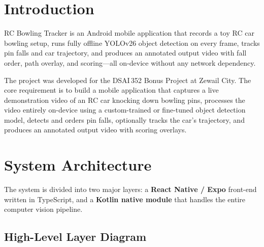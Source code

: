\documentclass{zc-ust-hw}
\begin{document}
\maketitle

\tableofcontents
\newpage

\section{Introduction}

RC Bowling Tracker is an Android mobile application that records a toy RC car bowling setup, runs fully offline YOLOv26 object detection on every frame, tracks pin falls and car trajectory, and produces an annotated output video with fall order, path overlay, and scoring—all on-device without any network dependency.

The project was developed for the DSAI\,352 Bonus Project at Zewail City.
The core requirement is to build a mobile application that captures a live demonstration video of an RC car knocking down bowling pins, processes the video entirely on-device using a custom-trained or fine-tuned object detection model, detects and orders pin falls, optionally tracks the car's trajectory, and produces an annotated output video with scoring overlays.

\section{System Architecture}

The system is divided into two major layers: a \textbf{React Native / Expo} front-end written in TypeScript, and a \textbf{Kotlin native module} that handles the entire computer vision pipeline.

\subsection{High-Level Layer Diagram}
\end{document}
